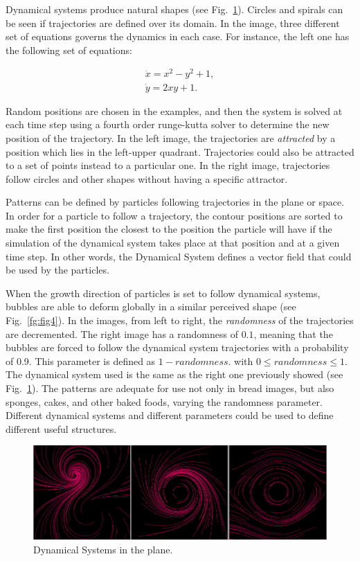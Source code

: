 \documentclass[oneside,a4paper,english,links]{amca}
\begin{document}
Dynamical systems produce natural shapes (see Fig.~\ref{fg:fig3}). Circles and spirals can be seen if trajectories are defined over its domain. In the image, three different set of equations governs the dynamics in each case. For instance, the left one has the following set of equations:

\begin{equation} \label{eq:simple}  
  \begin{aligned}
    \dot{x} = x^{2}-y^{2}+1,\\
    \dot{y} = 2xy+1.
  \end{aligned}
\end{equation}

Random positions are chosen in the examples, and then the system is solved at each time step using a fourth order runge-kutta solver to determine the new position of the trajectory. In the left image, the trajectories are {\em attracted} by a position which lies in the left-upper quadrant. Trajectories could also be attracted to a set of points instead to a particular one. In the right image, trajectories follow circles and other shapes without having a specific attractor.

Patterns can be defined by particles following trajectories in the plane or space. In order for a particle to follow a trajectory, the contour positions are sorted to make the first position the closest to the position the particle will have if the simulation of the dynamical system takes place at that position and at a given time step. In other words, the Dynamical System defines a vector field that could be used by the particles.

When the growth direction of particles is set to follow dynamical systems, bubbles are able to deform globally in a similar perceived shape (see Fig.~\ref{fg:fig4}). In the images, from left to right, the {\em randomness} of the trajectories are decremented. The right image has a randomness of $0.1$, meaning that the bubbles are forced to follow the dynamical system trajectories with a probability of 0.9. This parameter is defined as $1-randomness$. with $0 \leq randomness \leq 1$. The dynamical system used is the same as the right one previously showed (see Fig.~\ref{fg:fig3}).
The patterns are adequate for use not only in bread images, but also sponges, cakes, and other baked foods, varying the randomness parameter. Different dynamical systems and different parameters could be used to define different useful structures.

\begin{figure}[htb!]
  \centerline{\includegraphics[scale=0.28]{fig3}}
  \caption{Dynamical Systems in the plane.}
  \label{fg:fig3}
\end{figure}
\end{document}
